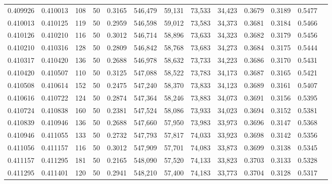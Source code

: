 \begin{tabular}{rrrrrrrrrrrrr}
0.409926 & 0.410013 &   108 &  50 &                                     0.3165 & 546,479 &  59,131 &  73,533 &  34,423 & 0.3679 & 0.3189 & 0.5477 \\
0.410013 & 0.410125 &   119 &  50 &                                     0.2959 & 546,598 &  59,012 &  73,583 &  34,373 & 0.3681 & 0.3184 & 0.5466 \\
0.410126 & 0.410210 &   116 &  50 &                                     0.3012 & 546,714 &  58,896 &  73,633 &  34,323 & 0.3682 & 0.3179 & 0.5456 \\
0.410210 & 0.410316 &   128 &  50 &                                     0.2809 & 546,842 &  58,768 &  73,683 &  34,273 & 0.3684 & 0.3175 & 0.5444 \\
0.410317 & 0.410420 &   136 &  50 &                                     0.2688 & 546,978 &  58,632 &  73,733 &  34,223 & 0.3686 & 0.3170 & 0.5431 \\
0.410420 & 0.410507 &   110 &  50 &                                     0.3125 & 547,088 &  58,522 &  73,783 &  34,173 & 0.3687 & 0.3165 & 0.5421 \\
0.410508 & 0.410614 &   152 &  50 &                                     0.2475 & 547,240 &  58,370 &  73,833 &  34,123 & 0.3689 & 0.3161 & 0.5407 \\
0.410616 & 0.410722 &   124 &  50 &                                     0.2874 & 547,364 &  58,246 &  73,883 &  34,073 & 0.3691 & 0.3156 & 0.5395 \\
0.410724 & 0.410838 &   160 &  50 &                                     0.2381 & 547,524 &  58,086 &  73,933 &  34,023 & 0.3694 & 0.3152 & 0.5381 \\
0.410839 & 0.410946 &   136 &  50 &                                     0.2688 & 547,660 &  57,950 &  73,983 &  33,973 & 0.3696 & 0.3147 & 0.5368 \\
0.410946 & 0.411055 &   133 &  50 &                                     0.2732 & 547,793 &  57,817 &  74,033 &  33,923 & 0.3698 & 0.3142 & 0.5356 \\
0.411056 & 0.411157 &   116 &  50 &                                     0.3012 & 547,909 &  57,701 &  74,083 &  33,873 & 0.3699 & 0.3138 & 0.5345 \\
0.411157 & 0.411295 &   181 &  50 &                                     0.2165 & 548,090 &  57,520 &  74,133 &  33,823 & 0.3703 & 0.3133 & 0.5328 \\
0.411295 & 0.411401 &   120 &  50 &                                     0.2941 & 548,210 &  57,400 &  74,183 &  33,773 & 0.3704 & 0.3128 & 0.5317 \\

\end{tabular}
